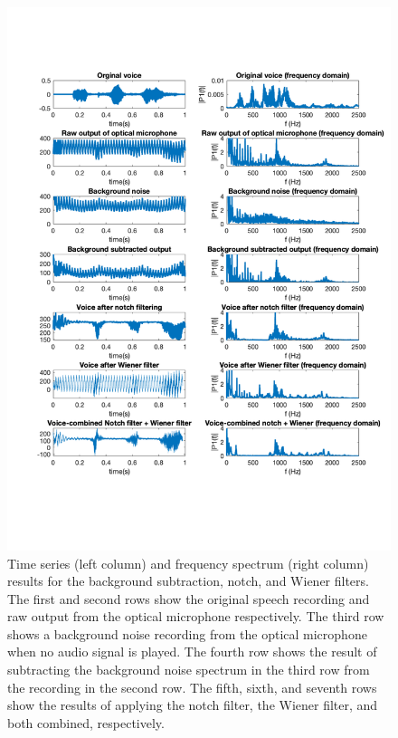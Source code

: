 \documentclass[paper-main.tex]{subfiles}
\begin{document}
\begin{figure}
	\begin{center}
	\includegraphics[width=\textwidth,trim={1cm 4.5cm 1cm 3.5cm},clip]{figures/notch_and_wiener_superplot_v2.pdf}
	\end{center}
	\caption{\label{fig:BackgroundNotchWienerCombined}
	Time series (left column) and frequency spectrum (right column) results for the background subtraction, notch, and Wiener filters.
	The first and second rows show the original speech recording and raw output from the optical microphone respectively. 
    The third row shows a background noise recording from the optical microphone when no audio signal is played. 
    The fourth row shows the result of subtracting the background noise spectrum in the third row from the recording in the second row. 
	The fifth, sixth, and seventh rows show the results of applying the notch filter, the Wiener filter, and both combined, respectively.
	}
\end{figure}
\end{document}
